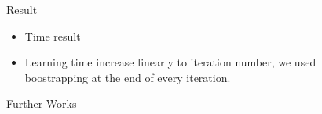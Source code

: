 \documentclass[final]{beamer}
\newlength{\sepwid}
\newlength{\onecolwid}
\begin{document}
\begin{frame}[t]
\begin{columns}[t]
\begin{column}{\onecolwid}

\end{column} %

\begin{column}{\sepwid}\end{column} %

\begin{column}{\onecolwid} %


\begin{block}{Result}
\begin{itemize}
	\item Time result
    \item Learning time increase linearly to iteration number, we used boostrapping at the end of every iteration.
\end{itemize}
\end{block}

\begin{block}{Further Works}

\end{block}

\end{column}

\end{columns} %

\end{frame} %
\end{document}
